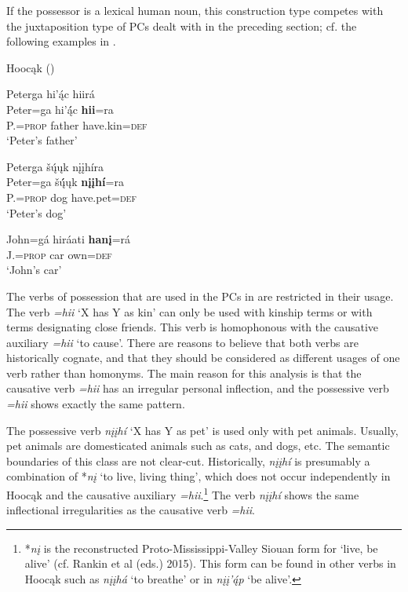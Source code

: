 \documentclass[output=paper]{LSP/langsci}
\begin{document}
If the possessor is a lexical human noun, this construction type competes with the juxtaposition type of PCs dealt with in the preceding section; cf. the following examples in .
 
\ea Hoocąk (\citealt[16]{Helmbrecht2003}) \label{petersthings}

\ea 
\glll Peterga hi'ą́c hiirá \\
Peter=ga        hi’ą́́c   \textbf{hii}=ra \\
P.=\textsc{prop}  father have.kin=\textsc{def} \\
\glt `Peter's father'

\ex 
\glll Peterga šų́ųk nįįhíra \\
Peter=ga      šų́́ųk   \textbf{nįįhí}=ra \\
P.=\textsc{prop} dog   have.pet=\textsc{def} \\
\glt `Peter's dog'

\ex \gll John=gá      hiráati \textbf{hanį}=rá \\
J.=\textsc{prop} car       own=\textsc{def} \\
\glt `John's car'

\z \z

The verbs of possession that are used in the PCs in  are restricted in their usage. The verb \textit{=hii} `X has Y as kin' can only be used with kinship terms or with terms designating close friends. This verb is homophonous with the causative auxiliary \textit{=hii} `to cause'. There are reasons to believe that both verbs are historically cognate, and that they should be considered as different usages of one verb rather than homonyms. The main reason for this analysis is that the causative verb \textit{=hii} has an irregular personal inflection, and the possessive verb \textit{=hii} shows exactly the same pattern. 

The possessive verb \textit{nįįh\'i} `X has Y as pet' is used only with pet animals. Usually, pet animals are domesticated animals such as cats, and dogs, etc. The semantic boundaries of this class are not clear-cut. Historically, \textit{nįįhí} is presumably a combination of *\textit{nį} `to live, living thing', which does not occur independently in Hoocąk and the causative auxiliary \textit{=hii}.\footnote{*\textit{n\k{i}} is the reconstructed Proto-Mississippi-Valley Siouan form for `live, be alive' (cf. Rankin et al (eds.) 2015). This form can be found in other verbs in Hooc\k{a}k such as \textit{n\k{i}\k{i}h\'a} `to breathe'  or in \textit{n\k{i}\k{i}'\'{\k{a}}p} `be alive'.} The verb \textit{nįįhí} shows the same inflectional irregularities as the causative verb \textit{=hii}. 
\end{document}
